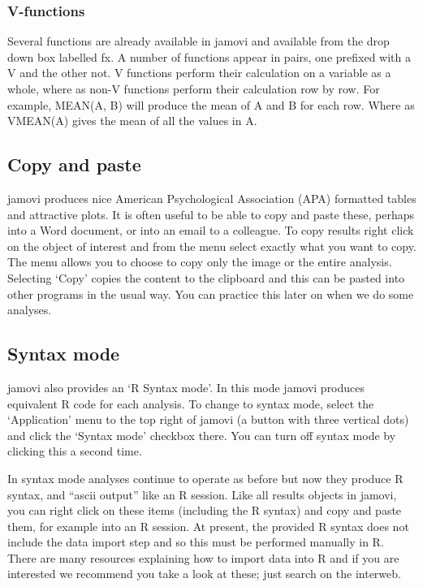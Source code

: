 \documentclass[
  a4paper,
]{book}
\begin{document}
\hypertarget{v-functions}{%
\subsubsection{V-functions}\label{v-functions}}

Several functions are already available in jamovi and available from the
drop down box labelled fx. A number of functions appear in pairs, one
prefixed with a V and the other not. V functions perform their
calculation on a variable as a whole, where as non-V functions perform
their calculation row by row. For example, MEAN(A, B) will produce the
mean of A and B for each row. Where as VMEAN(A) gives the mean of all
the values in A.

\hypertarget{copy-and-paste}{%
\subsection{Copy and paste}\label{copy-and-paste}}

jamovi produces nice American Psychological Association (APA) formatted
tables and attractive plots. It is often useful to be able to copy and
paste these, perhaps into a Word document, or into an email to a
colleague. To copy results right click on the object of interest and
from the menu select exactly what you want to copy. The menu allows you
to choose to copy only the image or the entire analysis. Selecting
`Copy' copies the content to the clipboard and this can be pasted into
other programs in the usual way. You can practice this later on when we
do some analyses.

\hypertarget{syntax-mode}{%
\subsection{Syntax mode}\label{syntax-mode}}

jamovi also provides an `R Syntax mode'. In this mode jamovi produces
equivalent R code for each analysis. To change to syntax mode, select
the `Application' menu to the top right of jamovi (a button with three
vertical dots) and click the `Syntax mode' checkbox there. You can turn
off syntax mode by clicking this a second time.

In syntax mode analyses continue to operate as before but now they
produce R syntax, and ``ascii output'' like an R session. Like all
results objects in jamovi, you can right click on these items (including
the R syntax) and copy and paste them, for example into an R session. At
present, the provided R syntax does not include the data import step and
so this must be performed manually in R. There are many resources
explaining how to import data into R and if you are interested we
recommend you take a look at these; just search on the interweb.
\end{document}
